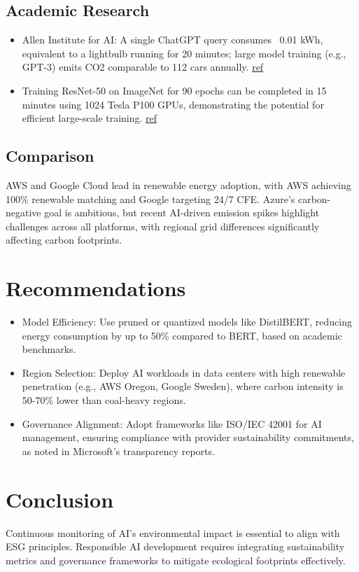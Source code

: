 \documentclass{article}
\theoremstyle{mytheoremstyle}
\theoremstyle{mytheoremstyle}
\theoremstyle{myproblemstyle}
\begin{document}
\subsection{Academic Research}
\begin{itemize}
    \item Allen Institute for AI: A single ChatGPT query consumes ~0.01 kWh, equivalent to a lightbulb running for 20 minutes; large model training (e.g., GPT-3) emits CO2 comparable to 112 cars annually. \href{https://www.baeldung.com/cs/chatgpt-large-language-models-power-consumption#:~:text=Each%20query%20ChatGPT%20process%20involves%20running%20the%20model%E2%80%99s,we%20consume%20around%200.0003%20kWh%20%28kilowatt-hours%29%20of%20energy.}{ref}
    \item Training ResNet-50 on ImageNet for 90 epochs can be completed in 15 minutes using 1024 Tesla P100 GPUs, demonstrating the potential for efficient large-scale training. \href{https://arxiv.org/abs/1711.04325?}{ref}
\end{itemize}

\subsection{Comparison}
AWS and Google Cloud lead in renewable energy adoption, with AWS achieving 100\% renewable matching and Google targeting 24/7 CFE. Azure’s carbon-negative goal is ambitious, but recent AI-driven emission spikes highlight challenges across all platforms, with regional grid differences significantly affecting carbon footprints.

\section{Recommendations}
\begin{itemize}
    \item Model Efficiency: Use pruned or quantized models like DistilBERT, reducing energy consumption by up to 50\% compared to BERT, based on academic benchmarks.

    \item Region Selection: Deploy AI workloads in data centers with high renewable penetration (e.g., AWS Oregon, Google Sweden), where carbon intensity is 50-70\% lower than coal-heavy regions.
    
    \item Governance Alignment: Adopt frameworks like ISO/IEC 42001 for AI management, ensuring compliance with provider sustainability commitments, as noted in Microsoft’s transparency reports.
\end{itemize}

\section{Conclusion}
Continuous monitoring of AI’s environmental impact is essential to align with ESG principles. Responsible AI development requires integrating sustainability metrics and governance frameworks to mitigate ecological footprints effectively.


% 
% 
\end{document}
